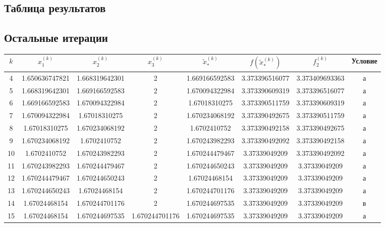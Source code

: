 \documentclass[12pt]{article}
\begin{document}
\begin{landscape}
\section{Таблица результатов}
\subsection{Остальные итерации}
\begin{longtable}{|c|c|c|c|c|c|c|c|}
\hline
\( k \) & \( x_1^{(k)} \) & \( x_2^{(k)} \) & \( x_3^{(k)} \) & \( \tilde{x}_{*}^{(k)} \) & \( f(\tilde{x}_{*}^{(k)}) \) & \( f_2^{(k)} \) & Условие \\
\hline
\endhead
4 & 1.650636747821 & 1.668319642301 & 2 & 1.669166592583 & 3.373396516077 & 3.373409693363 & а \\
\hline
5 & 1.668319642301 & 1.669166592583 & 2 & 1.670094322984 & 3.373390609319 & 3.373396516077 & а \\
\hline
6 & 1.669166592583 & 1.670094322984 & 2 & 1.67018310275 & 3.373390511759 & 3.373390609319 & а \\
\hline
7 & 1.670094322984 & 1.67018310275 & 2 & 1.670234068192 & 3.373390492675 & 3.373390511759 & а \\
\hline
8 & 1.67018310275 & 1.670234068192 & 2 & 1.6702410752 & 3.373390492158 & 3.373390492675 & а \\
\hline
9 & 1.670234068192 & 1.6702410752 & 2 & 1.670243982293 & 3.373390492092 & 3.373390492158 & а \\
\hline
10 & 1.6702410752 & 1.670243982293 & 2 & 1.670244479467 & 3.37339049209 & 3.373390492092 & а \\
\hline
11 & 1.670243982293 & 1.670244479467 & 2 & 1.670244650243 & 3.37339049209 & 3.37339049209 & а \\
\hline
12 & 1.670244479467 & 1.670244650243 & 2 & 1.67024468154 & 3.37339049209 & 3.37339049209 & а \\
\hline
13 & 1.670244650243 & 1.67024468154 & 2 & 1.670244701176 & 3.37339049209 & 3.37339049209 & а \\
\hline
14 & 1.67024468154 & 1.670244701176 & 2 & 1.670244697535 & 3.37339049209 & 3.37339049209 & в \\
\hline
15 & 1.67024468154 & 1.670244697535 & 1.670244701176 & 1.670244697535 & 3.37339049209 & 3.37339049209 & а \\
\hline
\end{longtable}
\end{landscape}
\end{document}
